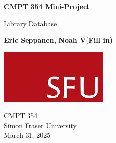 \begin{titlepage}
   \begin{center}
       \vspace*{1cm}

       \textbf{CMPT 354 Mini-Project}

       \vspace{0.5cm}
       Library Database

       \vspace{1.5cm}

       \textbf{Eric Seppanen, Noah V(Fill in)}

       \vfill

       \vspace{0.8cm}

       \includegraphics[width=0.4\textwidth]{SFU.png}

       CMPT 354\\
       Simon Fraser University\\
       March 31, 2025
   \end{center}
\end{titlepage}
